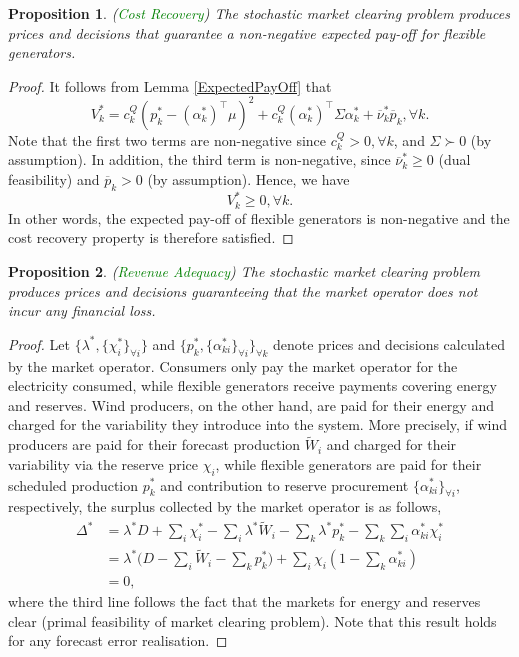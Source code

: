 \documentclass{article}
\newtheorem{proposition}{Proposition}
\begin{document}
\begin{proposition}
(\textcolor{green}{Cost Recovery}) The stochastic market clearing problem produces prices and decisions that guarantee a non-negative expected pay-off for flexible generators.
\end{proposition}
\begin{proof}
It follows from Lemma \ref{ExpectedPayOff} that
\begin{equation*}
V_k^*=  c_k^Q(p_k^* - (\alpha_k^*)^\top \mu)^2 + c_k^Q (\alpha_k^*)^\top \Sigma \alpha_k^* + \overline{\nu}_k^* \overline{p}_k, \forall k.
\end{equation*}
Note that the first two terms are non-negative since $c_k^Q > 0, \forall k$, and $\Sigma \succ 0$ (by assumption). In addition, the third term is non-negative, since $\overline{\nu}_k^* \ge 0$ (dual feasibility) and $\overline{p}_k > 0$ (by assumption). Hence, we have
\begin{equation*}
V_k^* \ge 0, \forall k.
\end{equation*}
In other words, the expected pay-off of flexible generators is non-negative and the cost recovery property is therefore satisfied.
\end{proof}

\begin{proposition}
(\textcolor{green}{Revenue Adequacy}) The stochastic market clearing problem produces prices and decisions guaranteeing that the market operator does not incur any financial loss.
\end{proposition}
\begin{proof}
Let $\{\lambda^*, \{\chi_i^*\}_{\forall i}\}$ and $\{p_k^*, \{\alpha_{ki}^*\}_{\forall i}\}_{\forall k}$ denote prices and decisions calculated by the market operator. Consumers only pay the market operator for the electricity consumed, while flexible generators receive payments covering energy and reserves. Wind producers, on the other hand, are paid for their energy and charged for the variability they introduce into the system. More precisely, if wind producers are paid for their forecast production $\tilde{W}_i$ and charged for their variability via the reserve price $\chi_i$, while flexible generators are paid for their scheduled production $p_k^*$ and contribution to reserve procurement $\{\alpha_{ki}^*\}_{\forall i}$, respectively, the surplus collected by the market operator is as follows,
\begin{align*}
\Delta^* &= \lambda^*D + \sum_i \chi_i^* - \sum_i \lambda^*\tilde{W}_i - \sum_k \lambda^*p_k^* - \sum_k \sum_i \alpha_{ki}^* \chi_i^*\\
&= \lambda^*\big(D - \sum_i \tilde{W}_i - \sum_k p_k^*\big) + \sum_i \chi_i (1 - \sum_k \alpha_{ki}^*)\\
&= 0,
\end{align*}
where the third line follows the fact that the markets for energy and reserves clear (primal feasibility of market clearing problem). Note that this result holds for any forecast error realisation.
\end{proof}
\end{document}
